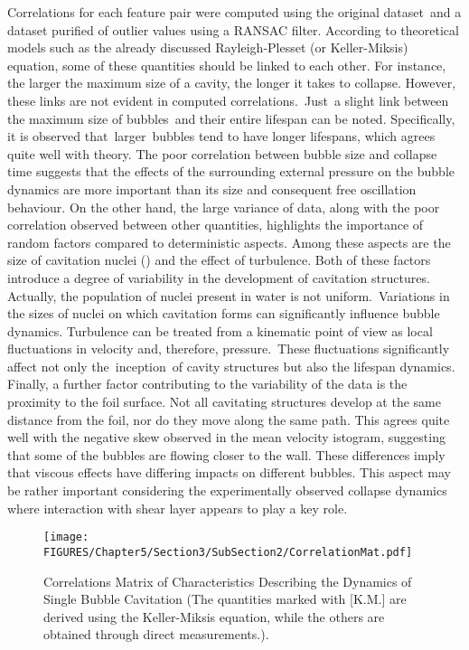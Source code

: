 Correlations for each feature pair were computed using the original dataset and a dataset purified of outlier values using a RANSAC filter.
According to theoretical models such as the already discussed Rayleigh-Plesset (or Keller-Miksis) equation, some of these quantities should be linked to each other.
For instance, the larger the maximum size of a cavity, the longer it takes to collapse.
However, these links are not evident in computed correlations. Just a slight link between the maximum size of bubbles and their entire lifespan can be noted. Specifically, it is observed that larger bubbles tend to have longer lifespans, which agrees quite well with theory.
The poor correlation between bubble size and collapse time suggests that the effects of the surrounding external pressure on the bubble dynamics are more important than its size and consequent free oscillation behaviour.
On the other hand, the large variance of data, along with the poor correlation observed between other quantities, highlights the importance of random factors compared to deterministic aspects.
Among these aspects are the size of cavitation nuclei (\cite{Rijsbergen2020}) and the effect of turbulence. Both of these factors introduce a degree of variability in the development of cavitation structures.
Actually, the population of nuclei present in water is not uniform. Variations in the sizes of nuclei on which cavitation forms can significantly influence bubble dynamics. 
Turbulence can be treated from a kinematic point of view as local fluctuations in velocity and, therefore, pressure. These fluctuations significantly affect not only the inception of cavity structures but also the lifespan dynamics.
Finally, a further factor contributing to the variability of the data is the proximity to the foil surface. Not all cavitating structures develop at the same distance from the foil, nor do they move along the same path. This agrees quite well with the negative skew observed in the mean velocity istogram, suggesting that some of the bubbles are flowing closer to the wall.
These differences imply that viscous effects have differing impacts on different bubbles.
This aspect may be rather important considering the experimentally observed collapse dynamics where interaction with shear layer appears to play a key role. 

\begin{figure}[h!]
    \centering
    \texttt{[image: FIGURES/Chapter5/Section3/SubSection2/CorrelationMat.pdf]}
    \caption{Correlations Matrix of Characteristics Describing the Dynamics of Single Bubble Cavitation (The quantities marked with [K.M.] are derived using the Keller-Miksis equation, while the others are obtained through direct measurements.).}
    \label{fig:CorrelationMat}
\end{figure}

